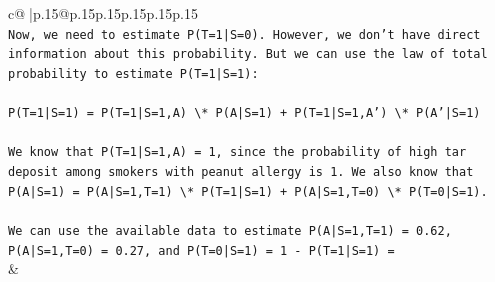\documentclass{article}
\begin{document}
{\begin{supertabular}{c@{$\;$}|p{.15\linewidth}@{}p{.15\linewidth}p{.15\linewidth}p{.15\linewidth}p{.15\linewidth}p{.15\linewidth}}
{{{\\ 
\texttt{Now, we need to estimate P(T=1|S=0). However, we don't have direct information about this probability. But we can use the law of total probability to estimate P(T=1|S=1):} \\
\\ 
\texttt{P(T=1|S=1) = P(T=1|S=1,A) \textbackslash{}* P(A|S=1) + P(T=1|S=1,A') \textbackslash{}* P(A'|S=1)} \\
\\ 
\texttt{We know that P(T=1|S=1,A) = 1, since the probability of high tar deposit among smokers with peanut allergy is 1. We also know that P(A|S=1) = P(A|S=1,T=1) \textbackslash{}* P(T=1|S=1) + P(A|S=1,T=0) \textbackslash{}* P(T=0|S=1).} \\
\\ 
\texttt{We can use the available data to estimate P(A|S=1,T=1) = 0.62, P(A|S=1,T=0) = 0.27, and P(T=0|S=1) = 1 {-} P(T=1|S=1) =} \\
            }
        }
    }
    & \\ \\


\end{supertabular}}
\end{document}
